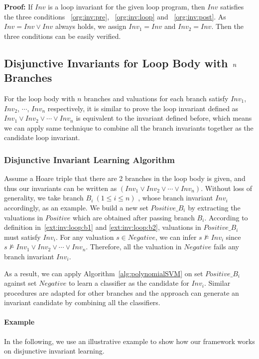\noindent \textbf{Proof:} If $Inv$ is a loop invariant for the given loop program,
then $Inv$ satisfies the three conditions ~\ref{org:inv:pre}, ~\ref{org:inv:loop} and ~\ref{org:inv:post}.
As $Inv = Inv \vee Inv$ always holds, we assign $Inv_1 = Inv$ and $Inv_2 = Inv$.
Then the three conditions can be easily verified. %

\subsection{Disjunctive Invariants for Loop Body with $\emph{n}$ Branches}
For the loop body with $n$ branches and valuations for each branch satisfy $Inv_1$, $Inv_2$, $\cdots$, $Inv_n$ respectively,
it is similar to prove the loop invariant defined as $Inv_1 \vee Inv_2 \vee \cdots \vee Inv_n$ is equivalent to the invariant defined before,
which means we can apply same technique to combine all the branch invariants together as the candidate loop invariant.

\subsubsection{Disjunctive Invariant Learning Algorithm}
Assume a Hoare triple that there are 2 branches in the loop body is given,
and thus our invariants can be written as $(Inv_1 \vee Inv_2 \vee \cdots \vee Inv_n)$.
Without loss of generality, we take branch $B_i~(1 \le i \le n)$ , whose branch invariant $Inv_i$ accordingly, as an example.
We build a new set $\mathit{Positive\_B_i}$ by extracting the valuations in $\mathit{Positive}$ which are obtained after passing branch $B_i$.
According to definition in~\ref{ext:inv:loop:b1} and \ref{ext:inv:loop:b2},
valuations in $\mathit{Positive\_B_i}$ must satisfy $Inv_i$.
For any valuation $s \in \mathit{Negative}$,
we can infer $s \not \models Inv_i$ since $s \not \models Inv_1 \vee Inv_2 \vee \cdots \vee Inv_n$.
Therefore, all the valuation in $\mathit{Negative}$ fails any branch invariant $Inv_i $.

As a result, we can apply Algorithm~\ref{alg:polynomialSVM} on set $\mathit{Positive\_B_i}$ against set $\mathit{Negative}$ to learn a classifier as the candidate for $Inv_i$.
Similar procedures are adapted for other branches and the approach can generate an invariant candidate by combining all the classifiers.

\paragraph{Example}
In the following, we use an illustrative example to show how our framework works on disjunctive invariant learning.

